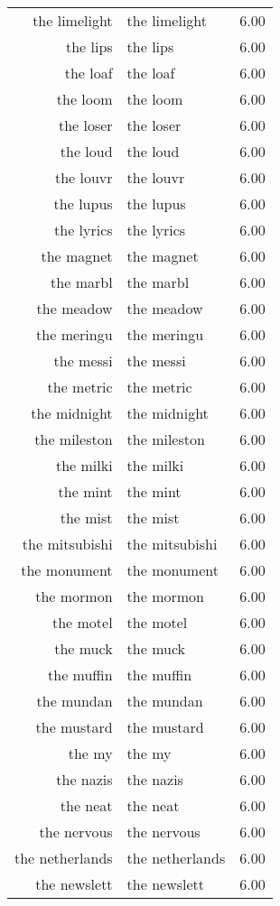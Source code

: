 \begin{table}[ht]
\begin{tabular}{rlr}
  the limelight & the limelight & 6.00 \\ 
  the lips & the lips & 6.00 \\ 
  the loaf & the loaf & 6.00 \\ 
  the loom & the loom & 6.00 \\ 
  the loser & the loser & 6.00 \\ 
  the loud & the loud & 6.00 \\ 
  the louvr & the louvr & 6.00 \\ 
  the lupus & the lupus & 6.00 \\ 
  the lyrics & the lyrics & 6.00 \\ 
  the magnet & the magnet & 6.00 \\ 
  the marbl & the marbl & 6.00 \\ 
  the meadow & the meadow & 6.00 \\ 
  the meringu & the meringu & 6.00 \\ 
  the messi & the messi & 6.00 \\ 
  the metric & the metric & 6.00 \\ 
  the midnight & the midnight & 6.00 \\ 
  the mileston & the mileston & 6.00 \\ 
  the milki & the milki & 6.00 \\ 
  the mint & the mint & 6.00 \\ 
  the mist & the mist & 6.00 \\ 
  the mitsubishi & the mitsubishi & 6.00 \\ 
  the monument & the monument & 6.00 \\ 
  the mormon & the mormon & 6.00 \\ 
  the motel & the motel & 6.00 \\ 
  the muck & the muck & 6.00 \\ 
  the muffin & the muffin & 6.00 \\ 
  the mundan & the mundan & 6.00 \\ 
  the mustard & the mustard & 6.00 \\ 
  the my & the my & 6.00 \\ 
  the nazis & the nazis & 6.00 \\ 
  the neat & the neat & 6.00 \\ 
  the nervous & the nervous & 6.00 \\ 
  the netherlands & the netherlands & 6.00 \\ 
  the newslett & the newslett & 6.00 \\ 

\end{tabular}
\end{table}
